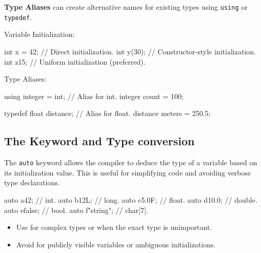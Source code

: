 \textbf{Type Aliases} can create alternative names for existing types using \texttt{using} or \texttt{typedef}.

\begin{exampleblock}
    Variable Initialization:
    \begin{codeblock}[language=C++]
        int x = 42;     // Direct initialization.
        int y(30);      // Constructor-style initialization.
        int z{15};      // Uniform initialization (preferred).
    \end{codeblock}
    Type Aliases:
    \begin{codeblock}[language=C++]
        using integer = int;    // Alias for int.
        integer count = 100;
        
        typedef float distance; // Alias for float.
        distance meters = 250.5;
    \end{codeblock}
\end{exampleblock}



\newpage

\subsection{The  Keyword and Type conversion}

The \texttt{auto} keyword allows the compiler to deduce the type of a variable based on its initialization value. This is useful for simplifying code and avoiding verbose type declarations.

\begin{exampleblock}
    \begin{codeblock}[language=C++]
auto a{42};         // int.
auto b{12L};        // long.
auto c{5.0F};       // float.
auto d{10.0};       // double.
auto e{false};      // bool.
auto f{"string"};   // char[7].
    \end{codeblock}
\end{exampleblock}

\begin{tipsblock}
    \begin{itemize}
        \item Use  for complex types or when the exact type is unimportant.
        \item Avoid  for publicly visible variables or ambiguous initializations.
    \end{itemize}
\end{tipsblock}

